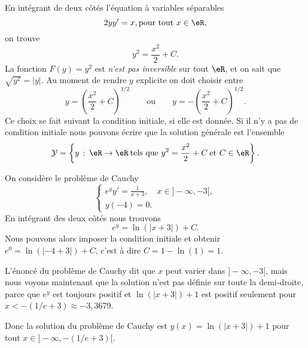 \begin{example}
	En intégrant de deux côtés l'équation à variables séparables
	\begin{equation}
		2y y' = x, \text{pour tout } x\in\eR,
	\end{equation}
	on trouve
	\[
		y^2 = \frac{x^2}{2} + C .
	\]
	La fonction \( F(y) = y^2\) est \emph{n'est pas inversible} sur tout \( \eR\), et on sait que \(\sqrt{y^2} = |y|\).  Au moment de rendre \( y\) explicite on doit choisir entre
	\[
		y = \left(\frac{x^2}{2} + C \right)^{1/2}\qquad \text{ou}\qquad y = -\left(\frac{x^2}{2} + C \right)^{1/2} .
	\]
	Ce choix se fait suivant la condition initiale, si elle est donnée. Si il n'y a pas de condition initiale nous pouvons écrire que la solution générale est l'ensemble
	\[
		\mathcal{Y} =\left\{ y \,:\, \eR \to \eR\:\text{tels que }  y^2 = \frac{x^2}{2} + C \:\text{et } C\in\eR\right\}.
	\]
\end{example}

\begin{example}
	On considère le problème de Cauchy
	\begin{equation}
		\begin{cases}
			e^y y' = \frac{1}{x+3}, \quad x\in ]-\infty, -3[, \\
			y(-4) = 0.
		\end{cases}
	\end{equation}
	En intégrant des deux côtés nous trouvons
	\[
		e^y = \ln(|x+3|) +C.
	\]
	Nous pouvons alors imposer la condition initiale et obtenir \( e^{0} =\ln(|-4+3|) +C \), c'est \`a dire \( C = 1- \ln(1) = 1\).
	\begin{remark}
		L'énoncé du problème de Cauchy dit que \( x\) peut varier dans \(]-\infty, -3[\), mais nous voyons maintenant que la solution n'est pas définie sur toute la demi-droite, parce que \( e^y\) est toujours positif  et \( \ln(|x+3|) +1\) est positif seulement pour \( x < -(1/e + 3)\approx -3,3679\).
	\end{remark}
	Donc la solution du problème de Cauchy est \(y(x) = \ln(|x+3|) +1\) pour tout \( x\in ]-\infty, -(1/e +3)[\).
\end{example}

